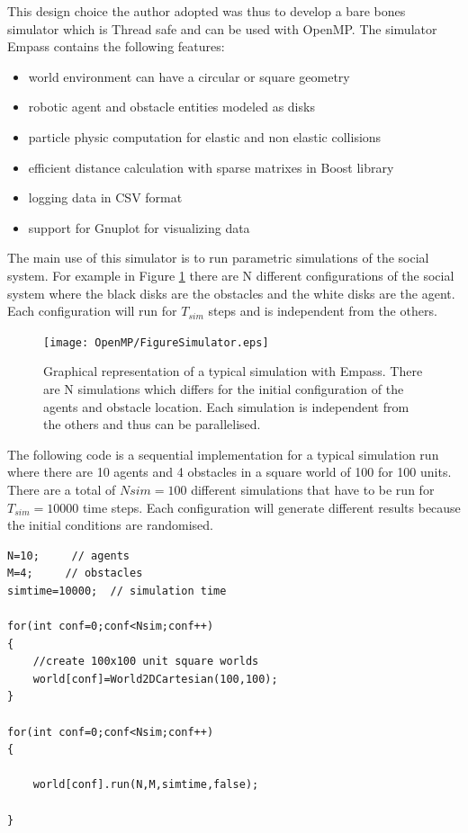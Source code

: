 This design choice the author adopted was thus to develop a bare bones simulator
which is Thread safe and can be used with OpenMP.
The simulator Empass contains the following features:
\begin{itemize}
 \item world environment can have a circular or square geometry
 \item robotic agent and obstacle entities modeled as disks
 \item particle physic computation for elastic and non elastic collisions
 \item efficient distance calculation with sparse matrixes in Boost library
 \item logging data in CSV format
 \item support for Gnuplot for visualizing data
\end{itemize}
The main use of this simulator is to run parametric simulations
of the social system. For example in Figure \ref{Fig:Parallel:Empass}
there are N different configurations of the social system where
the black disks are the obstacles and the white disks are the agent.
Each configuration will run for $T_{sim}$ steps and is independent
from the others.

\begin{figure}[htbp]
\begin{center}
\texttt{[image: OpenMP/FigureSimulator.eps]}
\end{center}
\small{
\caption[Empass simulator]{
Graphical representation of a typical simulation with Empass.
There are N simulations which differs for the initial configuration of
the agents and obstacle location. Each simulation is independent from
the others and thus can be parallelised.
\label{Fig:Parallel:Empass}}}
\end{figure}

The following code is a sequential implementation for a typical simulation
run where there are 10 agents and 4 obstacles in a square world of 100 for
100 units.
There are a total of $Nsim=100$ different simulations that have to be run for
$T_{sim}=10000$ time steps.
Each configuration will generate different results because the initial conditions
are randomised.
\begin{lstlisting}
N=10;     // agents
M=4;     // obstacles
simtime=10000;  // simulation time

for(int conf=0;conf<Nsim;conf++)
{
    //create 100x100 unit square worlds
    world[conf]=World2DCartesian(100,100);
}

for(int conf=0;conf<Nsim;conf++)
{

    world[conf].run(N,M,simtime,false);

}
\end{lstlisting}

